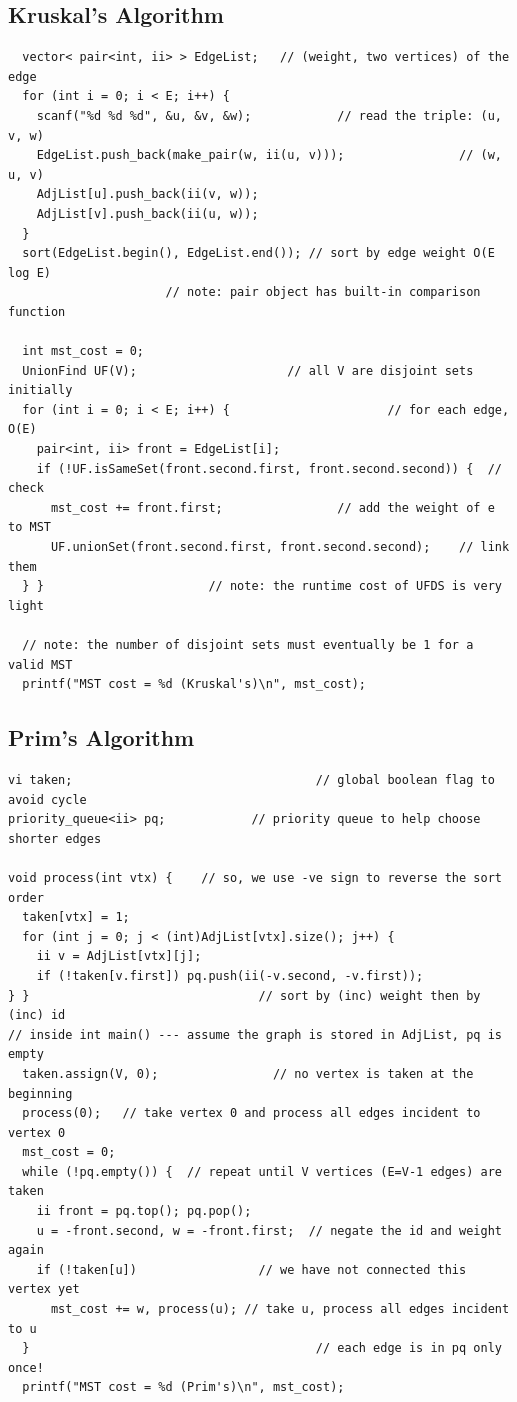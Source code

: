 \documentclass[10pt,landscape]{article}
\begin{document}
\begin{multicols}{2}
\subsection{Kruskal's Algorithm}
\begin{lstlisting}
  vector< pair<int, ii> > EdgeList;   // (weight, two vertices) of the edge
  for (int i = 0; i < E; i++) {
    scanf("%d %d %d", &u, &v, &w);            // read the triple: (u, v, w)
    EdgeList.push_back(make_pair(w, ii(u, v)));                // (w, u, v)
    AdjList[u].push_back(ii(v, w));
    AdjList[v].push_back(ii(u, w));
  }
  sort(EdgeList.begin(), EdgeList.end()); // sort by edge weight O(E log E)
                      // note: pair object has built-in comparison function

  int mst_cost = 0;
  UnionFind UF(V);                     // all V are disjoint sets initially
  for (int i = 0; i < E; i++) {                      // for each edge, O(E)
    pair<int, ii> front = EdgeList[i];
    if (!UF.isSameSet(front.second.first, front.second.second)) {  // check
      mst_cost += front.first;                // add the weight of e to MST
      UF.unionSet(front.second.first, front.second.second);    // link them
  } }                       // note: the runtime cost of UFDS is very light

  // note: the number of disjoint sets must eventually be 1 for a valid MST
  printf("MST cost = %d (Kruskal's)\n", mst_cost);
\end{lstlisting}

\subsection{Prim's Algorithm}
\begin{lstlisting}
vi taken;                                  // global boolean flag to avoid cycle
priority_queue<ii> pq;            // priority queue to help choose shorter edges

void process(int vtx) {    // so, we use -ve sign to reverse the sort order
  taken[vtx] = 1;
  for (int j = 0; j < (int)AdjList[vtx].size(); j++) {
    ii v = AdjList[vtx][j];
    if (!taken[v.first]) pq.push(ii(-v.second, -v.first));
} }                                // sort by (inc) weight then by (inc) id
// inside int main() --- assume the graph is stored in AdjList, pq is empty
  taken.assign(V, 0);                // no vertex is taken at the beginning
  process(0);   // take vertex 0 and process all edges incident to vertex 0
  mst_cost = 0;
  while (!pq.empty()) {  // repeat until V vertices (E=V-1 edges) are taken
    ii front = pq.top(); pq.pop();
    u = -front.second, w = -front.first;  // negate the id and weight again
    if (!taken[u])                 // we have not connected this vertex yet
      mst_cost += w, process(u); // take u, process all edges incident to u
  }                                        // each edge is in pq only once!
  printf("MST cost = %d (Prim's)\n", mst_cost);
\end{lstlisting}
\newpage


\end{multicols}
\end{document}
